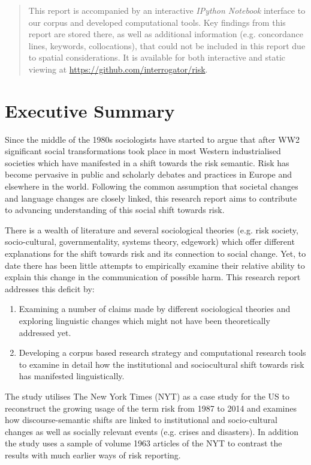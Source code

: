 \documentclass{report}
\begin{document}
\begin{abstract}
    This report is accompanied by an interactive \emph{IPython Notebook} interface to our corpus and developed computational tools. Key findings from this report are stored there, as well as additional information (e.g. concordance lines, keywords, collocations), that could not be included in this report due to spatial considerations. It is available for both interactive and static viewing at \url{https://github.com/interrogator/risk}.

    \end{abstract}
    \cleardoublepage
    \singlespacing
    \tableofcontents
    \onehalfspacing
    \cleardoublepage

\section*{Executive Summary}

Since the middle of the 1980s sociologists have started to argue that after WW2 significant social transformations took place in most Western industrialised societies which have manifested in a shift towards the risk semantic. Risk has become pervasive in public and scholarly debates and practices in Europe and elsewhere in the world. Following the common assumption that societal changes and language changes are closely linked, this research report aims to contribute to advancing understanding of this social shift towards risk. 

There is a wealth of literature and several sociological theories (e.g. risk society, socio-cultural, governmentality, systems theory, edgework) which offer different explanations for the shift towards risk and its connection to social change. Yet, to date there has been little attempts to empirically examine their relative ability to explain this change in the communication of possible harm. This research report addresses this deficit by:
%
\begin{enumerate}
\item Examining a number of claims made by different sociological theories and exploring linguistic changes which might not have been theoretically addressed yet. 
\item Developing a corpus based research strategy and computational research tools to examine in detail how the institutional and sociocultural shift towards risk has manifested linguistically.
\end{enumerate}
%
The study utilises The New York Times (NYT) as a case study for the US to reconstruct the growing usage of the term risk from 1987 to 2014 and examines how discourse-semantic shifts are linked to institutional and socio-cultural changes as well as socially relevant events (e.g. crises and disasters). In addition the study uses a sample of volume 1963 articles of the NYT to contrast the results with much earlier ways of risk reporting.
\end{document}
